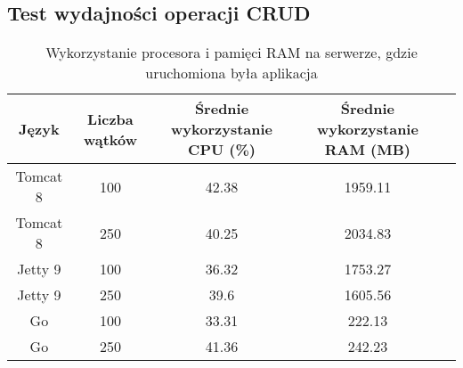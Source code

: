  \newpage
 \subsection{Test wydajności operacji CRUD}
% 
 \clearpage

\begin{table}[!htb]
\centering
\caption{Wykorzystanie procesora i pamięci RAM na serwerze, gdzie uruchomiona była aplikacja}
\label{tab:app-clean-crud}
\begin{tabular}{@{}ccccl@{}}
\toprule
\textbf{Język} & \textbf{Liczba wątków} & \multicolumn{1}{p{3cm}}{\textbf{Średnie wykorzystanie CPU (\%)}} & \multicolumn{1}{p{3cm}}{\textbf{Średnie wykorzystanie RAM (MB)}} &  \\ \midrule
Tomcat 8       & 100                    & 42.38                             & 1959.11                          &  \\
Tomcat 8       & 250                    & 40.25                             & 2034.83                          &  \\
Jetty 9       & 100                    & 36.32                             & 1753.27                          &  \\
Jetty 9       & 250                    & 39.6                             & 1605.56                          &  \\
Go       & 100                    & 33.31                             & 222.13                          &  \\
Go       & 250                    & 41.36                             & 242.23                          &  \\
\bottomrule
\end{tabular}
\end{table}


